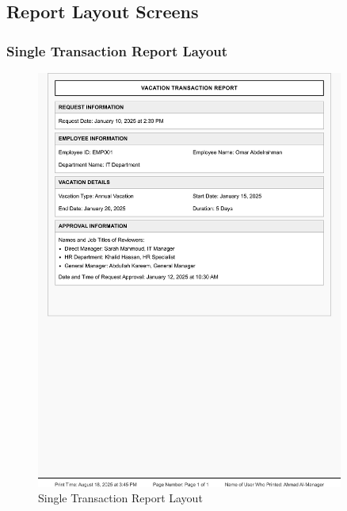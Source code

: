 \documentclass[12pt,a4paper]{article}
\begin{document}
\subsection{Report Layout Screens}

\subsubsection{Single Transaction Report Layout}
\begin{figure}[H]
\centering
\includegraphics[width=0.9\textwidth]{Wireframes/Print-Layout-Single-Transaction-Report/Print-Layout-Single-Transaction-Report-1.png}
\caption{Single Transaction Report Layout}
\label{fig:single-transaction-report-layout}
\end{figure}
\end{document}
